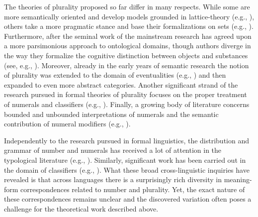 \documentclass[output=paper]{langscibook}
\begin{document}
The theories of plurality proposed so far differ in many respects. While some are more semantically oriented and develop models grounded in lattice-theory (e.g., \citealt{krifka1989nominal, landman1989groupsi, landman2000events, champollion2017parts}), others take a more pragmatic stance and base their formalizations on sets (e.g., \citealt{schwarzschild1996pluralities, winter2001flexibility}). Furthermore, after the seminal work of \citet{link1983logical} the mainstream research has agreed upon a more parsimonious approach to ontological domains, though authors diverge in the way they formalize the cognitive distinction between objects and substances (see, e.g., \citealt{krifka1989nominal, chierchia1998plurality, chierchia2010mass, rothstein2010counting, landman2011count, landman2016iceberg}). Moreover, already in the early years of semantic research the notion of plurality was extended to the domain of eventualities (e.g., \citealt{bach1986algebra}) and then expanded to even more abstract categories. Another significant strand of the research pursued in formal theories of plurality focuses on the proper treatment of numerals and classifiers (e.g., \citealt{krifka1995common,krifka1999least, landman2004indefinites, ionin_matushansky2006composition, ionin_matushansky2018cardinals, bale_gagnon_khanjian2011crosslinguistic, bale_coon2014classifiers, rothstein2017semantics}). Finally, a growing body of literature concerns bounded and unbounded interpretations of numerals and the semantic contribution of numeral modifiers (e.g., \citealt{geurts2006take, nouwen2010two, kennedy2015fregean}). 

Independently to the research pursued in formal linguistics, the distribution and grammar of number and numerals has received a lot of attention in the typological literature (e.g., \citealt{corbett1978universals, corbett2000number, greenberg1978generalizations, hurford1987language, hurford1998interaction}). Similarly, significant work has been carried out in the domain of classifiers (e.g., \citealt{dixon1982noun, aikhenvald2000classifiers}). What these broad cross-linguistic inquiries have revealed is that across languages there is a surprisingly rich diversity in meaning-form correspondences related to number and plurality. Yet, the exact nature of these correspondences remains unclear and the discovered variation often poses a challenge for the theoretical work described above.
\end{document}
